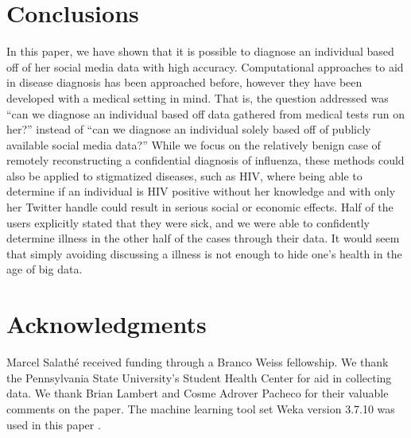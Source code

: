 \documentclass{acm_proc_article-sp}
\begin{document}
\section{Conclusions}


In this paper, we have shown that it is possible to diagnose an individual based off of her social media data with high accuracy. Computational approaches to aid in disease diagnosis has been approached before, however they have been developed with a medical setting in mind. That is, the question addressed was ``can we diagnose an individual based off data gathered from medical tests run on her?'' instead of ``can we diagnose an individual solely based off of publicly available social media data?''  While we focus on the relatively benign case of remotely reconstructing a confidential diagnosis of influenza, these methods could also be applied to stigmatized diseases, such as HIV, where being able to determine if an individual is HIV positive without her knowledge and with only her Twitter handle could result in serious social or economic effects. Half of the users explicitly stated that they were sick, and we were able to confidently determine illness in the other half of the cases through their data. It would seem that simply avoiding discussing a illness is not enough to hide one's health in the age of big data. 


\section{Acknowledgments}

Marcel Salath\'e received funding through a Branco Weiss fellowship. We thank the Pennsylvania State University's Student Health Center for aid in collecting data. We thank Brian Lambert and Cosme Adrover Pacheco for their valuable comments on the paper. The machine learning tool set Weka version 3.7.10 was used in this paper \cite{Hall:2009ud}.

\end{document}
